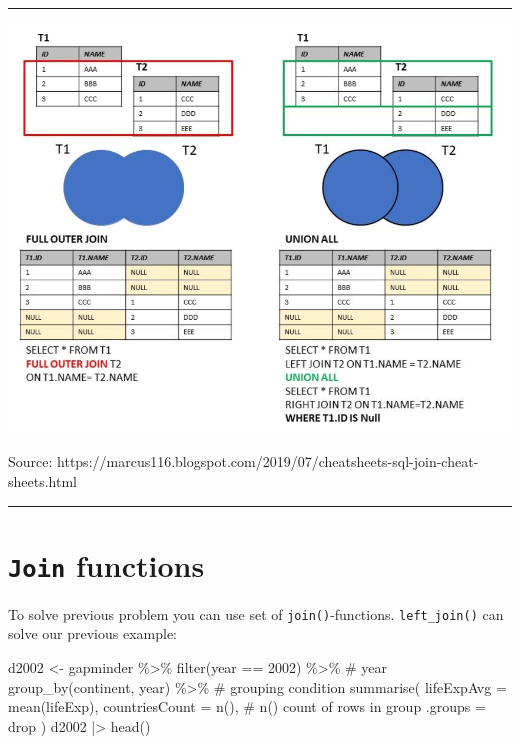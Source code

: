 \documentclass[
  letterpaper,
  DIV=11,
  numbers=noendperiod]{scrreprt}
\newenvironment{Shaded}{\begin{snugshade}}{\end{snugshade}}
\newcommand{\AttributeTok}[1]{\textcolor[rgb]{0.40,0.45,0.13}{#1}}
\newcommand{\CommentTok}[1]{\textcolor[rgb]{0.37,0.37,0.37}{#1}}
\newcommand{\DecValTok}[1]{\textcolor[rgb]{0.68,0.00,0.00}{#1}}
\newcommand{\FunctionTok}[1]{\textcolor[rgb]{0.28,0.35,0.67}{#1}}
\newcommand{\NormalTok}[1]{\textcolor[rgb]{0.00,0.23,0.31}{#1}}
\newcommand{\OtherTok}[1]{\textcolor[rgb]{0.00,0.23,0.31}{#1}}
\newcommand{\SpecialCharTok}[1]{\textcolor[rgb]{0.37,0.37,0.37}{#1}}
\newcommand{\StringTok}[1]{\textcolor[rgb]{0.13,0.47,0.30}{#1}}
\begin{document}
\begin{center}\rule{0.5\linewidth}{0.5pt}\end{center}

\includegraphics{img/da-dplyr/sqljoin3.png}

Source:
https://marcus116.blogspot.com/2019/07/cheatsheets-sql-join-cheat-sheets.html

\begin{center}\rule{0.5\linewidth}{0.5pt}\end{center}

\section{\texorpdfstring{\texttt{Join}
functions}{Join functions}}\label{join-functions}

To solve previous problem you can use set of \texttt{join()}-functions.
\texttt{left\_join()} can solve our previous example:

\begin{Shaded}
\begin{Highlighting}[]
\NormalTok{d2002 }\OtherTok{\textless{}{-}}\NormalTok{ gapminder }\SpecialCharTok{\%\textgreater{}\%}
            \FunctionTok{filter}\NormalTok{(year }\SpecialCharTok{==} \DecValTok{2002}\NormalTok{) }\SpecialCharTok{\%\textgreater{}\%} \CommentTok{\# year}
            \FunctionTok{group\_by}\NormalTok{(continent, year) }\SpecialCharTok{\%\textgreater{}\%} \CommentTok{\# grouping condition}
            \FunctionTok{summarise}\NormalTok{(}
                \AttributeTok{lifeExpAvg =} \FunctionTok{mean}\NormalTok{(lifeExp),}
                \AttributeTok{countriesCount =} \FunctionTok{n}\NormalTok{(), }\CommentTok{\# n() count of rows in group }
                \AttributeTok{.groups =} \StringTok{\textquotesingle{}drop\textquotesingle{}}
\NormalTok{            )}
\NormalTok{d2002 }\SpecialCharTok{|\textgreater{}} \FunctionTok{head}\NormalTok{()}
\end{Highlighting}
\end{Shaded}
\end{document}

